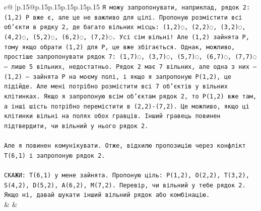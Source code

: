 \documentclass{article}
\begin{document}
{\begin{supertabular}{c@{$\;$}|p{.15\linewidth}@{}p{.15\linewidth}p{.15\linewidth}p{.15\linewidth}p{.15\linewidth}p{.15\linewidth}}
{{{\texttt{Я можу запропонувати, наприклад, рядок 2: (1,2) P вже є, але це не важливо для цілі. Пропоную розмістити всі об'єкти в рядку 2, де багато вільних місць: (1,2)◌, (2,2)◌, (3,2)◌, (4,2)◌, (5,2)◌, (6,2)◌, (7,2)◌. Усі сім вільні! Але (1,2) зайнята P, тому якщо обрати (1,2) для P, це вже збігається. Однак, можливо, простіше запропонувати рядок 7: (1,7)◌, (3,7)◌, (5,7)◌, (6,7)◌, (7,7)◌ — лише 5 вільних, недостатньо. Рядок 2 має 7 вільних, але одна з них — (1,2) — зайнята P на моєму полі, і якщо я запропоную P(1,2), це підійде. Але мені потрібно розмістити всі 7 об'єктів у вільних клітинках. Якщо я запропоную всім об'єктам рядок 2, то P(1,2) вже там, а інші шість потрібно перемістити в (2,2){-}(7,2). Це можливо, якщо ці клітинки вільні на полях обох гравців. Інший гравець повинен підтвердити, чи вільний у нього рядок 2.} \\
\\ 
\texttt{Але я повинен комунікувати. Отже, відхилю пропозицію через конфлікт T(6,1) і запропоную рядок 2.} \\
\\ 
\texttt{СКАЖИ: T(6,1) у мене зайнята. Пропоную ціль: P(1,2), O(2,2), T(3,2), S(4,2), D(5,2), A(6,2), M(7,2). Перевір, чи вільний у тебе рядок 2. Якщо ні, давай шукати інший вільний рядок або комбінацію.} \\
            }
        }
    }
    & & \\ \\


\end{supertabular}}
\end{document}
